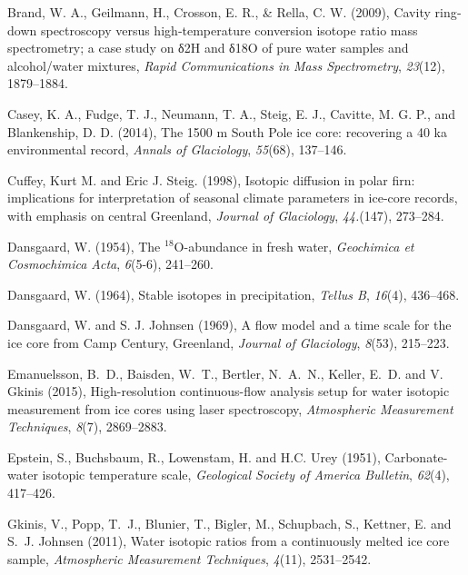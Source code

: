 \documentclass[draft, jgrga]{AGUTeX}
\begin{document}
\begin{article}
\begin{thebibliography}{}
 Brand, W. A., Geilmann, H., Crosson, E. R., \& Rella, C. W. (2009), Cavity ring‐down spectroscopy versus high‐temperature conversion isotope ratio mass spectrometry; a case study on δ2H and δ18O of pure water samples and alcohol/water mixtures, \textit{Rapid Communications in Mass Spectrometry}, \textit{23}(12), 1879--1884.

 Casey, K. A., Fudge, T. J., Neumann, T. A., Steig, E. J., Cavitte, M. G. P., and Blankenship, D. D. (2014), The 1500 m South Pole ice core: recovering a 40 ka environmental record, \textit{Annals of Glaciology}, \textit{55}(68), 137--146.

Cuffey, Kurt M. and Eric J. Steig. (1998), Isotopic diffusion in polar firn: implications for interpretation of seasonal climate parameters in ice-core records, with emphasis on central Greenland, \textit{Journal of Glaciology}, \textit{44.}(147), 273--284.

 Dansgaard, W. (1954),
The $^{18}${O}-abundance in fresh water,
\textit{Geochimica et Cosmochimica Acta}, \textit{6}(5-6), 241--260.

 Dansgaard, W. (1964),
Stable isotopes in precipitation,
\textit{Tellus B}, \textit{16}(4), 436--468.

 Dansgaard, W. and S. J. Johnsen (1969), A flow model and a time scale for the ice core from Camp Century, Greenland, \textit{Journal of Glaciology}, \textit{8}(53), 215--223.

Emanuelsson, B.~D., Baisden, W.~T., Bertler, N.~A.~N., Keller, E.~D. and V. Gkinis (2015),
High-resolution continuous-flow analysis setup for water isotopic measurement from ice cores using laser spectroscopy,
\textit{Atmospheric Measurement Techniques}, \textit{8}(7), 2869--2883.

Epstein, S., Buchsbaum, R., Lowenstam, H. and H.C. Urey (1951),
Carbonate-water isotopic temperature scale,
\textit{Geological Society of America Bulletin}, \textit{62}(4), 417--426.

Gkinis, V., Popp, T.~J., Blunier, T., Bigler, M., Schupbach, S., Kettner, E. and S.~J. Johnsen (2011),
Water isotopic ratios from a continuously melted ice core sample,
\textit{Atmospheric Measurement Techniques}, \textit{4}(11), 2531--2542.


\end{thebibliography}
\end{article}
\end{document}
